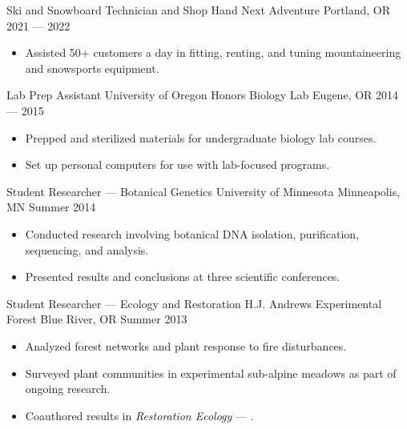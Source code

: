 \showoff
{Ski and Snowboard Technician and Shop Hand}
{Next Adventure}
{Portland, OR}
{2021 --- 2022}
\begin{itemize}[label=$\triangleright$]
    \item Assisted 50+ customers a day in fitting, renting, and tuning mountaineering and snowsports equipment.
\end{itemize}

\myBreak

\showoff
{Lab Prep Assistant}
{University of Oregon Honors Biology Lab}
{Eugene, OR}
{2014 --- 2015}
\begin{itemize}[label=$\triangleright$]
    \item Prepped and sterilized materials for undergraduate biology lab courses.
    \item Set up personal computers for use with lab-focused programs.
\end{itemize}

\myBreak

\showoff
{Student Researcher --- Botanical Genetics}
{University of Minnesota}
{Minneapolis, MN}
{Summer 2014}
\begin{itemize}[label=$\triangleright$]
    \item Conducted research involving botanical DNA isolation, purification, sequencing, and analysis.
    \item Presented results and conclusions at three scientific conferences.
\end{itemize}

\myBreak

\showoff
{Student Researcher --- Ecology and Restoration}
{H.J. Andrews Experimental Forest}
{Blue River, OR}
{Summer 2013}
\begin{itemize}[label=$\triangleright$]
    \item Analyzed forest networks and plant response to fire disturbances.
    \item Surveyed plant communities in experimental sub-alpine meadows as part of ongoing research.
    \item Coauthored results in \emph{Restoration Ecology} --- .
\end{itemize}

